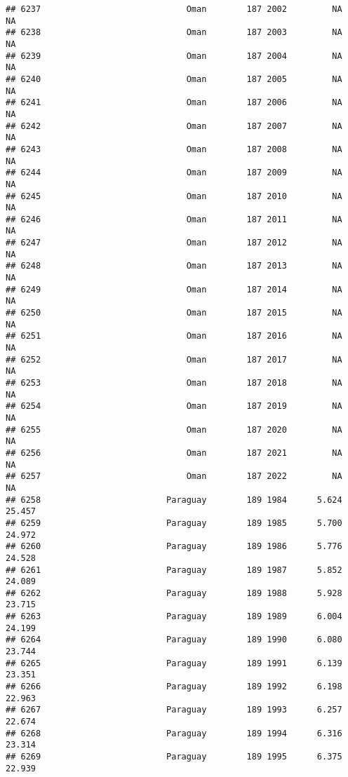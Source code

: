 \documentclass[
]{article}
\begin{document}
\begin{verbatim}
## 6237                             Oman        187 2002         NA         NA
## 6238                             Oman        187 2003         NA         NA
## 6239                             Oman        187 2004         NA         NA
## 6240                             Oman        187 2005         NA         NA
## 6241                             Oman        187 2006         NA         NA
## 6242                             Oman        187 2007         NA         NA
## 6243                             Oman        187 2008         NA         NA
## 6244                             Oman        187 2009         NA         NA
## 6245                             Oman        187 2010         NA         NA
## 6246                             Oman        187 2011         NA         NA
## 6247                             Oman        187 2012         NA         NA
## 6248                             Oman        187 2013         NA         NA
## 6249                             Oman        187 2014         NA         NA
## 6250                             Oman        187 2015         NA         NA
## 6251                             Oman        187 2016         NA         NA
## 6252                             Oman        187 2017         NA         NA
## 6253                             Oman        187 2018         NA         NA
## 6254                             Oman        187 2019         NA         NA
## 6255                             Oman        187 2020         NA         NA
## 6256                             Oman        187 2021         NA         NA
## 6257                             Oman        187 2022         NA         NA
## 6258                         Paraguay        189 1984      5.624     25.457
## 6259                         Paraguay        189 1985      5.700     24.972
## 6260                         Paraguay        189 1986      5.776     24.528
## 6261                         Paraguay        189 1987      5.852     24.089
## 6262                         Paraguay        189 1988      5.928     23.715
## 6263                         Paraguay        189 1989      6.004     24.199
## 6264                         Paraguay        189 1990      6.080     23.744
## 6265                         Paraguay        189 1991      6.139     23.351
## 6266                         Paraguay        189 1992      6.198     22.963
## 6267                         Paraguay        189 1993      6.257     22.674
## 6268                         Paraguay        189 1994      6.316     23.314
## 6269                         Paraguay        189 1995      6.375     22.939

\end{verbatim}
\end{document}
